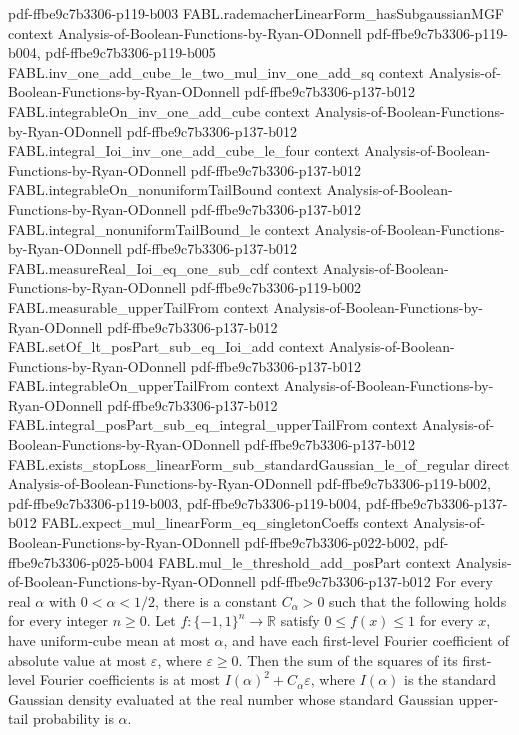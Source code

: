 \begin{theorem}
  {pdf-ffbe9c7b3306-p119-b003}
\proofstep
  {FABL.rademacherLinearForm_hasSubgaussianMGF}
  {context}
  {Analysis-of-Boolean-Functions-by-Ryan-ODonnell}
  {pdf-ffbe9c7b3306-p119-b004,
    pdf-ffbe9c7b3306-p119-b005}
\proofstep
  {FABL.inv_one_add_cube_le_two_mul_inv_one_add_sq}
  {context}
  {Analysis-of-Boolean-Functions-by-Ryan-ODonnell}
  {pdf-ffbe9c7b3306-p137-b012}
\proofstep
  {FABL.integrableOn_inv_one_add_cube}
  {context}
  {Analysis-of-Boolean-Functions-by-Ryan-ODonnell}
  {pdf-ffbe9c7b3306-p137-b012}
\proofstep
  {FABL.integral_Ioi_inv_one_add_cube_le_four}
  {context}
  {Analysis-of-Boolean-Functions-by-Ryan-ODonnell}
  {pdf-ffbe9c7b3306-p137-b012}
\proofstep
  {FABL.integrableOn_nonuniformTailBound}
  {context}
  {Analysis-of-Boolean-Functions-by-Ryan-ODonnell}
  {pdf-ffbe9c7b3306-p137-b012}
\proofstep
  {FABL.integral_nonuniformTailBound_le}
  {context}
  {Analysis-of-Boolean-Functions-by-Ryan-ODonnell}
  {pdf-ffbe9c7b3306-p137-b012}
\proofstep
  {FABL.measureReal_Ioi_eq_one_sub_cdf}
  {context}
  {Analysis-of-Boolean-Functions-by-Ryan-ODonnell}
  {pdf-ffbe9c7b3306-p119-b002}
\proofstep
  {FABL.measurable_upperTailFrom}
  {context}
  {Analysis-of-Boolean-Functions-by-Ryan-ODonnell}
  {pdf-ffbe9c7b3306-p137-b012}
\proofstep
  {FABL.setOf_lt_posPart_sub_eq_Ioi_add}
  {context}
  {Analysis-of-Boolean-Functions-by-Ryan-ODonnell}
  {pdf-ffbe9c7b3306-p137-b012}
\proofstep
  {FABL.integrableOn_upperTailFrom}
  {context}
  {Analysis-of-Boolean-Functions-by-Ryan-ODonnell}
  {pdf-ffbe9c7b3306-p137-b012}
\proofstep
  {FABL.integral_posPart_sub_eq_integral_upperTailFrom}
  {context}
  {Analysis-of-Boolean-Functions-by-Ryan-ODonnell}
  {pdf-ffbe9c7b3306-p137-b012}
\proofstep
  {FABL.exists_stopLoss_linearForm_sub_standardGaussian_le_of_regular}
  {direct}
  {Analysis-of-Boolean-Functions-by-Ryan-ODonnell}
  {pdf-ffbe9c7b3306-p119-b002,
    pdf-ffbe9c7b3306-p119-b003,
    pdf-ffbe9c7b3306-p119-b004,
    pdf-ffbe9c7b3306-p137-b012}
\proofstep
  {FABL.expect_mul_linearForm_eq_singletonCoeffs}
  {context}
  {Analysis-of-Boolean-Functions-by-Ryan-ODonnell}
  {pdf-ffbe9c7b3306-p022-b002,
    pdf-ffbe9c7b3306-p025-b004}
\proofstep
  {FABL.mul_le_threshold_add_posPart}
  {context}
  {Analysis-of-Boolean-Functions-by-Ryan-ODonnell}
  {pdf-ffbe9c7b3306-p137-b012}
For every real $\alpha$ with $0<\alpha<1/2$, there is a constant $C_\alpha>0$ such that
the following holds for every integer $n\ge0$. Let $f:\{-1,1\}^n\to\mathbb R$ satisfy
$0\le f(x)\le1$ for every $x$, have uniform-cube mean at most $\alpha$, and have each
first-level Fourier coefficient of absolute value at most $\varepsilon$, where
$\varepsilon\ge0$. Then the sum of the squares of its first-level Fourier coefficients
is at most $I(\alpha)^2+C_\alpha\varepsilon$, where $I(\alpha)$ is the standard Gaussian
density evaluated at the real number whose standard Gaussian upper-tail probability is
$\alpha$.
\end{theorem}
